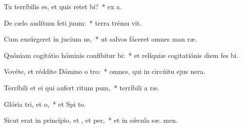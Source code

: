 \item Tu terríbilis es, et quis retet bi?~* ex   a.
\item De cælo audítum feti juum:~* terra trému  vit.
\item Cum exsúrgeret in jucium us,~* ut salvos fáceret omnes man ræ.
\item Quóniam cogitátio hóminis confibitur bi:~* et relíquiæ cogitatiónis diem fes  bi.
\item Vovéte, et réddite Dómino o tro:~* omnes, qui in circúitu ejus  nera.
\item Terríbili et ei qui aufert ritum pum,~* terríbili a  ræ.
\item Glória tri, et o,~* et Spi to.
\item Sicut erat in princípio, et , et per,~* et in sǽcula sæ. men.
